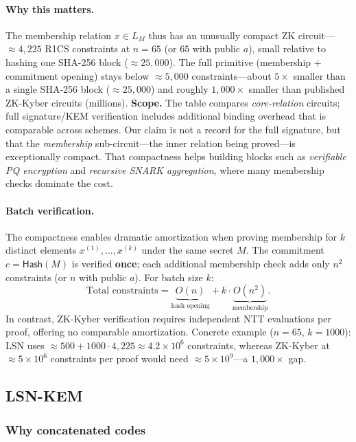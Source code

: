 \documentclass[11pt,a4paper]{article}
\theoremstyle{plain}
\theoremstyle{definition}
\begin{document}
\paragraph{Why this matters.} The membership relation $x \in L_M$ thus has an unusually compact ZK circuit---$\approx 4{,}225$ R1CS constraints at $n=65$ (or $65$ with public $a$), small relative to hashing one SHA-256 block ($\approx 25{,}000$). The full primitive (membership $+$ commitment opening) stays below $\approx 5{,}000$ constraints---about $5\times$ smaller than a single SHA-256 block ($\approx 25{,}000$) and roughly $1{,}000\times$ smaller than published ZK-Kyber circuits (millions). \textbf{Scope.} The table compares \emph{core-relation} circuits; full signature/KEM verification includes additional binding overhead that is comparable across schemes. Our claim is not a record for the full signature, but that the \emph{membership} sub-circuit---the inner relation being proved---is exceptionally compact. That compactness helps building blocks such as \emph{verifiable PQ encryption} and \emph{recursive SNARK aggregation}, where many membership checks dominate the cost.

\paragraph{Batch verification.}
The compactness enables dramatic amortization when proving membership for $k$ distinct elements $x^{(1)},\dots,x^{(k)}$ under the same secret $M$. The commitment $c=\mathsf{Hash}(M)$ is verified \textbf{once}; each additional membership check adds only $n^2$ constraints (or $n$ with public $a$). For batch size $k$:
\[
\text{Total constraints} = \underbrace{O(n)}_{\text{hash opening}} + k \cdot \underbrace{O(n^2)}_{\text{membership}}.
\]
In contrast, ZK-Kyber verification requires independent NTT evaluations per proof, offering no comparable amortization. Concrete example ($n=65$, $k=1000$): LSN uses $\approx 500 + 1000\cdot 4{,}225 \approx 4.2\times 10^6$ constraints, whereas ZK-Kyber at $\approx 5\times 10^6$ constraints per proof would need $\approx 5\times 10^9$---a $1{,}000\times$ gap.

\subsection{LSN-KEM}
\label{sec:kem}

\subsubsection{Why concatenated codes}
\label{subsubsec:why-concat}
\end{document}
